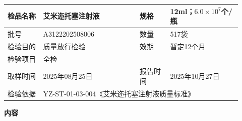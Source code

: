 \documentclass[UTF8,10pt,a4paper,fontset=fandol]{ctexart}
\newcommand{\fieldvalue}[1]{#1}
\begin{document}
\begin{tabular}{|p{0.14\linewidth}|p{0.38\linewidth}|p{0.12\linewidth}|p{0.28\linewidth}|}
\hline
检品名称 &
\fieldvalue{艾米迩托塞注射液} &
规格 &
\fieldvalue{12ml；$6.0\times10^{7}$个/瓶}
\\ \hline
批号 &
\fieldvalue{A3122202508006} &
数量 &
\fieldvalue{517袋}
\\ \hline
检验目的 &
\fieldvalue{质量放行检验} &
效期 &
\fieldvalue{暂定12个月}
\\ \hline
检验项目 &
\fieldvalue{全检} &
\multicolumn{2}{l|}{} \\ \hline
取样时间 &
\fieldvalue{2025年08月25日} &
报告时间 &
\fieldvalue{2025年10月27日}
\\ \hline
检验依据 &
\multicolumn{3}{l|}{
\fieldvalue{YZ-ST-01-03-004《艾米迩托塞注射液质量标准》}
} \\ \hline
\end{tabular}

\begin{center}
\textbf{内容}
\end{center}
\end{document}
